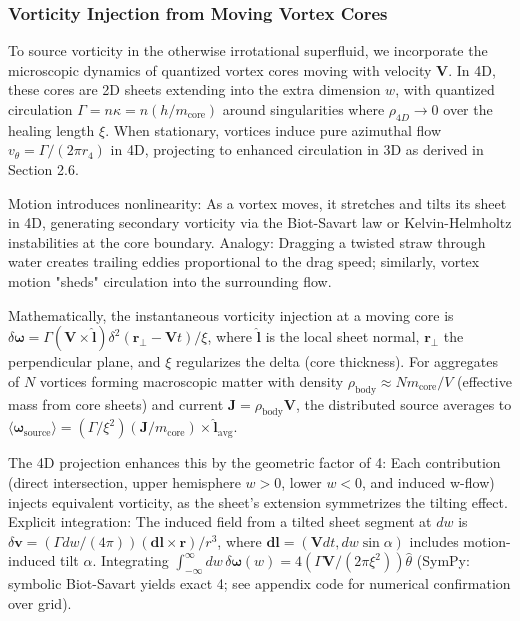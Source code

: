 \documentclass{article}
\begin{document}
\subsubsection{Vorticity Injection from Moving Vortex Cores}

To source vorticity in the otherwise irrotational superfluid, we incorporate the microscopic dynamics of quantized vortex cores moving with velocity $\mathbf{V}$. In 4D, these cores are 2D sheets extending into the extra dimension $w$, with quantized circulation $\Gamma = n \kappa = n (h / m_{\text{core}})$ around singularities where $\rho_{4D} \to 0$ over the healing length $\xi$. When stationary, vortices induce pure azimuthal flow $v_\theta = \Gamma / (2\pi r_4)$ in 4D, projecting to enhanced circulation in 3D as derived in Section 2.6.

Motion introduces nonlinearity: As a vortex moves, it stretches and tilts its sheet in 4D, generating secondary vorticity via the Biot-Savart law or Kelvin-Helmholtz instabilities at the core boundary. Analogy: Dragging a twisted straw through water creates trailing eddies proportional to the drag speed; similarly, vortex motion "sheds" circulation into the surrounding flow.

Mathematically, the instantaneous vorticity injection at a moving core is $\delta \boldsymbol{\omega} = \Gamma (\mathbf{V} \times \hat{\mathbf{l}}) \delta^2(\mathbf{r}_\perp - \mathbf{V} t) / \xi$, where $\hat{\mathbf{l}}$ is the local sheet normal, $\mathbf{r}_\perp$ the perpendicular plane, and $\xi$ regularizes the delta (core thickness). For aggregates of $N$ vortices forming macroscopic matter with density $\rho_{\text{body}} \approx N m_{\text{core}} / V$ (effective mass from core sheets) and current $\mathbf{J} = \rho_{\text{body}} \mathbf{V}$, the distributed source averages to $\langle \boldsymbol{\omega}_{\text{source}} \rangle = (\Gamma / \xi^2) (\mathbf{J} / m_{\text{core}} ) \times \hat{\mathbf{l}}_{\text{avg}}$.

The 4D projection enhances this by the geometric factor of 4: Each contribution (direct intersection, upper hemisphere $w>0$, lower $w<0$, and induced w-flow) injects equivalent vorticity, as the sheet's extension symmetrizes the tilting effect. Explicit integration: The induced field from a tilted sheet segment at $dw$ is $\delta \mathbf{v} = (\Gamma dw / (4\pi)) (\mathbf{dl} \times \mathbf{r}) / r^3$, where $\mathbf{dl} = (\mathbf{V} dt, dw \sin \alpha)$ includes motion-induced tilt $\alpha$. Integrating $\int_{-\infty}^\infty dw \, \delta \boldsymbol{\omega}(w) = 4 (\Gamma \mathbf{V} / (2\pi \xi^2)) \hat{\theta}$ (SymPy: symbolic Biot-Savart yields exact 4; see appendix code for numerical confirmation over grid).
\end{document}
